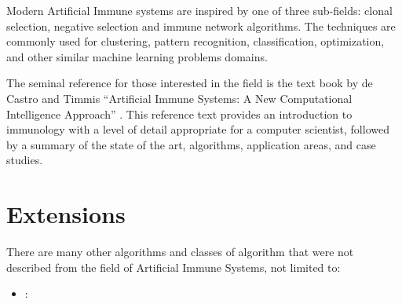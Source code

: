 \begin{bibunit}
Modern Artificial Immune systems are inspired by one of three sub-fields: clonal selection, negative selection and immune network algorithms. The techniques are commonly used for clustering, pattern recognition, classification, optimization, and other similar machine learning problems domains.

The seminal reference for those interested in the field is the text book by de Castro and Timmis ``Artificial Immune Systems: A New Computational Intelligence Approach'' \cite{Castro2002}. This reference text provides an introduction to immunology with a level of detail appropriate for a computer scientist, followed by a summary of the state of the art, algorithms, application areas, and case studies.

% 
% 
\section{Extensions}
There are many other algorithms and classes of algorithm that were not described from the field of Artificial Immune Systems, not limited to:

\begin{itemize}
	\item \textbf{}:
\end{itemize}


\putbib
\end{bibunit}

\newpage\begin{bibunit}\putbib\end{bibunit}
\newpage\begin{bibunit}\putbib\end{bibunit}
\newpage\begin{bibunit}\putbib\end{bibunit}
\newpage\begin{bibunit}\putbib\end{bibunit}
\newpage\begin{bibunit}\putbib\end{bibunit}
